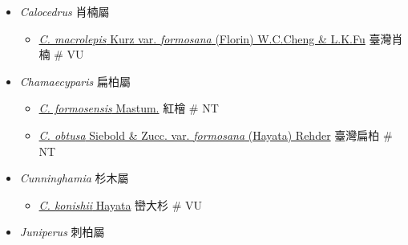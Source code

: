 
  \begin{itemize}
 \item[] \textit{Calocedrus} 肖楠屬
                            
  \begin{itemize}
        \item[] \href{http://www.theplantlist.org/tpl1.1/search?q=Calocedrus+macrolepis+var.+formosana}{\textit{C. macrolepis} Kurz var. \textit{formosana} (Florin) W.C.Cheng \& L.K.Fu}  
                                    臺灣肖楠  \# VU
  \end{itemize}
 \item[] \textit{Chamaecyparis} 扁柏屬
                            
  \begin{itemize}
        \item[] \href{http://www.theplantlist.org/tpl1.1/search?q=Chamaecyparis+formosensis}{\textit{C. formosensis} Mastum.}   紅檜  \# NT
        \item[] \href{http://www.theplantlist.org/tpl1.1/search?q=Chamaecyparis+obtusa+var.+formosana}{\textit{C. obtusa} Siebold \& Zucc. var. \textit{formosana} (Hayata) Rehder}  
                                    臺灣扁柏  \# NT
  \end{itemize}
 \item[] \textit{Cunninghamia} 杉木屬
                            
  \begin{itemize}
        \item[] \href{http://www.theplantlist.org/tpl1.1/search?q=Cunninghamia+konishii}{\textit{C. konishii} Hayata}   巒大杉  \# VU
  \end{itemize}
 \item[] \textit{Juniperus} 刺柏屬
                            

\end{itemize}

